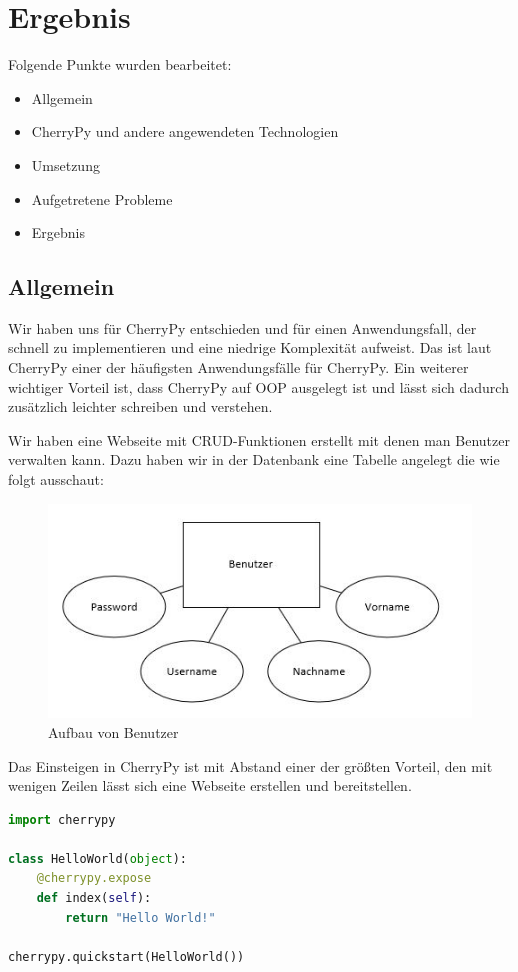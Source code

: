 \section{Ergebnis}
\label{sec:Ergebnis}

Folgende Punkte wurden bearbeitet:

\begin{itemize}
	\item Allgemein
	\item CherryPy und andere angewendeten Technologien
	\item Umsetzung
	\item Aufgetretene Probleme	
	\item Ergebnis
\end{itemize}

\subsection{Allgemein}

Wir haben uns für CherryPy entschieden und für einen Anwendungsfall, der schnell zu implementieren und eine niedrige Komplexität aufweist. Das ist laut CherryPy einer der häufigsten Anwendungsfälle für CherryPy. Ein weiterer wichtiger Vorteil ist, dass CherryPy auf OOP ausgelegt ist und lässt sich dadurch zusätzlich leichter schreiben und verstehen.

Wir haben eine Webseite mit CRUD-Funktionen erstellt mit denen man Benutzer verwalten kann. 
Dazu haben wir in der Datenbank eine Tabelle angelegt die wie folgt ausschaut:

\begin{figure}[H]
	\centering
	\includegraphics[width=0.5\linewidth]{images/db}
	\caption{Aufbau von Benutzer}
	\label{fig:Benutzeraufbau}
\end{figure}


Das Einsteigen in CherryPy ist mit Abstand einer der größten Vorteil, den mit wenigen Zeilen lässt sich eine Webseite erstellen und bereitstellen.
\begin{lstlisting}[language=Python]
import cherrypy

class HelloWorld(object):
	@cherrypy.expose
	def index(self):
		return "Hello World!"

cherrypy.quickstart(HelloWorld())
\end{lstlisting}

